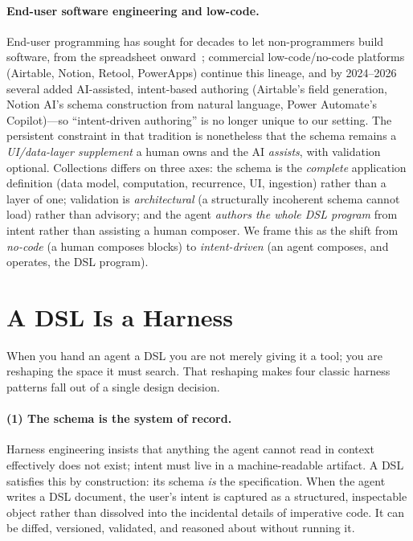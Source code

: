 \documentclass[11pt]{article}
\begin{document}
\paragraph{End-user software engineering and low-code.}
End-user programming has sought for decades to let non-programmers build software,
from the spreadsheet onward~\citep{nardi1993small,ko2011enduser}; commercial
low-code/no-code platforms (Airtable, Notion, Retool, PowerApps) continue this
lineage, and by 2024--2026 several added AI-assisted, intent-based authoring
(Airtable's field generation, Notion AI's schema construction from natural
language, Power Automate's Copilot)---so ``intent-driven authoring'' is no longer
unique to our setting. The persistent constraint in that tradition is nonetheless
that the schema remains a \emph{UI/data-layer supplement} a human owns and the AI
\emph{assists}, with validation optional. Collections differs on three axes: the
schema is the \emph{complete} application definition (data model, computation,
recurrence, UI, ingestion) rather than a layer of one; validation is
\emph{architectural} (a structurally incoherent schema cannot load) rather than
advisory; and the agent \emph{authors the whole DSL program} from intent rather
than assisting a human composer. We frame this as the shift from \emph{no-code}
(a human composes blocks) to \emph{intent-driven} (an agent composes, and
operates, the DSL program).

\section{A DSL Is a Harness}
\label{sec:harness}

When you hand an agent a DSL you are not merely giving it a tool; you are reshaping
the space it must search. That reshaping makes four classic harness patterns fall
out of a single design decision.

\paragraph{(1) The schema is the system of record.}
Harness engineering insists that anything the agent cannot read in context
effectively does not exist; intent must live in a machine-readable artifact. A DSL
satisfies this by construction: its schema \emph{is} the specification. When the
agent writes a DSL document, the user's intent is captured as a structured,
inspectable object rather than dissolved into the incidental details of imperative
code. It can be diffed, versioned, validated, and reasoned about without running
it.
\end{document}

